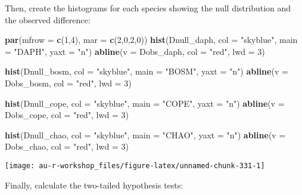 \documentclass[]{book}
\newenvironment{Shaded}{\begin{snugshade}}{\end{snugshade}}
\newcommand{\KeywordTok}[1]{\textcolor[rgb]{0.13,0.29,0.53}{\textbf{#1}}}
\newcommand{\DataTypeTok}[1]{\textcolor[rgb]{0.13,0.29,0.53}{#1}}
\newcommand{\DecValTok}[1]{\textcolor[rgb]{0.00,0.00,0.81}{#1}}
\newcommand{\StringTok}[1]{\textcolor[rgb]{0.31,0.60,0.02}{#1}}
\newcommand{\NormalTok}[1]{#1}
\theoremstyle{definition}
\theoremstyle{definition}
\theoremstyle{definition}
\theoremstyle{remark}
\begin{document}
Then, create the histograms for each species showing the null
distribution and the observed difference:

\begin{Shaded}
\begin{Highlighting}[]
\KeywordTok{par}\NormalTok{(}\DataTypeTok{mfrow =} \KeywordTok{c}\NormalTok{(}\DecValTok{1}\NormalTok{,}\DecValTok{4}\NormalTok{), }\DataTypeTok{mar =} \KeywordTok{c}\NormalTok{(}\DecValTok{2}\NormalTok{,}\DecValTok{0}\NormalTok{,}\DecValTok{2}\NormalTok{,}\DecValTok{0}\NormalTok{))}
\KeywordTok{hist}\NormalTok{(Dnull_daph, }\DataTypeTok{col =} \StringTok{"skyblue"}\NormalTok{, }\DataTypeTok{main =} \StringTok{"DAPH"}\NormalTok{, }\DataTypeTok{yaxt =} \StringTok{"n"}\NormalTok{)}
\KeywordTok{abline}\NormalTok{(}\DataTypeTok{v =}\NormalTok{ Dobs_daph, }\DataTypeTok{col =} \StringTok{"red"}\NormalTok{, }\DataTypeTok{lwd =} \DecValTok{3}\NormalTok{)}

\KeywordTok{hist}\NormalTok{(Dnull_bosm, }\DataTypeTok{col =} \StringTok{"skyblue"}\NormalTok{, }\DataTypeTok{main =} \StringTok{"BOSM"}\NormalTok{, }\DataTypeTok{yaxt =} \StringTok{"n"}\NormalTok{)}
\KeywordTok{abline}\NormalTok{(}\DataTypeTok{v =}\NormalTok{ Dobs_bosm, }\DataTypeTok{col =} \StringTok{"red"}\NormalTok{, }\DataTypeTok{lwd =} \DecValTok{3}\NormalTok{)}

\KeywordTok{hist}\NormalTok{(Dnull_cope, }\DataTypeTok{col =} \StringTok{"skyblue"}\NormalTok{, }\DataTypeTok{main =} \StringTok{"COPE"}\NormalTok{, }\DataTypeTok{yaxt =} \StringTok{"n"}\NormalTok{)}
\KeywordTok{abline}\NormalTok{(}\DataTypeTok{v =}\NormalTok{ Dobs_cope, }\DataTypeTok{col =} \StringTok{"red"}\NormalTok{, }\DataTypeTok{lwd =} \DecValTok{3}\NormalTok{)}

\KeywordTok{hist}\NormalTok{(Dnull_chao, }\DataTypeTok{col =} \StringTok{"skyblue"}\NormalTok{, }\DataTypeTok{main =} \StringTok{"CHAO"}\NormalTok{, }\DataTypeTok{yaxt =} \StringTok{"n"}\NormalTok{)}
\KeywordTok{abline}\NormalTok{(}\DataTypeTok{v =}\NormalTok{ Dobs_chao, }\DataTypeTok{col =} \StringTok{"red"}\NormalTok{, }\DataTypeTok{lwd =} \DecValTok{3}\NormalTok{)}
\end{Highlighting}
\end{Shaded}

\begin{center}\texttt{[image: au-r-workshop\_files/figure-latex/unnamed-chunk-331-1]} \end{center}

Finally, calculate the two-tailed hypothesis tests:
\end{document}
